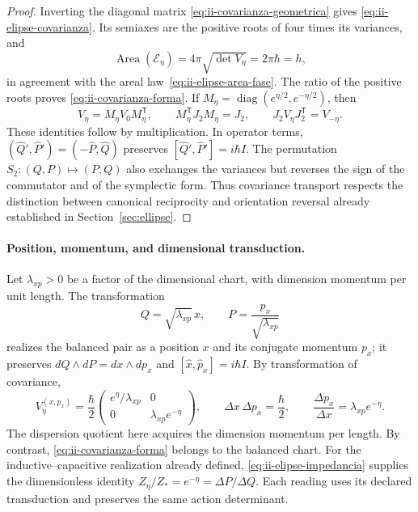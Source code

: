 \begin{proof}
Inverting the diagonal matrix
\eqref{eq:ii-covarianza-geometrica} gives
\eqref{eq:ii-elipse-covarianza}. Its semiaxes are the positive roots of
four times its variances, and
\[
 \operatorname{Area}(\mathcal E_\eta)
 =4\pi\sqrt{\det V_\eta}=2\pi\hbar=h,
\]
in agreement with the areal law~\eqref{eq:ii-elipse-area-fase}.
The ratio of the positive roots proves
\eqref{eq:ii-covarianza-forma}.
If \(M_\eta=\operatorname{diag}(e^{\eta/2},e^{-\eta/2})\), then
\[
 V_\eta=M_\eta V_0M_\eta^{\mathsf T},\qquad
 M_\eta^{\mathsf T}J_2M_\eta=J_2,\qquad
 J_2V_\eta J_2^{\mathsf T}=V_{-\eta}.
\]
These identities follow by multiplication. In operator terms,
\((\widehat Q',\widehat P')=(-\widehat P,\widehat Q)\) preserves
\([\widehat Q',\widehat P']=i\hbar I\). The permutation
\(S_2:(Q,P)\mapsto(P,Q)\) also exchanges the variances but reverses
the sign of the commutator and of the symplectic form. Thus covariance
transport respects the distinction between canonical reciprocity and
orientation reversal already established in Section~\ref{sec:ellipse}.
\end{proof}

\paragraph{Position, momentum, and dimensional transduction.}
Let \(\lambda_{xp}>0\) be a factor of the dimensional chart, with dimension
momentum per unit length. The transformation
\[
 Q=\sqrt{\lambda_{xp}}\,x,\qquad
 P=\frac{p_x}{\sqrt{\lambda_{xp}}}
\]
realizes the balanced pair as a position \(x\) and its conjugate momentum
\(p_x\); it preserves \(dQ\wedge dP=dx\wedge dp_x\) and
\([\widehat x,\widehat p_x]=i\hbar I\). By transformation of
covariance,
\begin{equation}
 V_\eta^{(x,p_x)}=\frac{\hbar}{2}
 \begin{pmatrix}e^\eta/\lambda_{xp}&0\\
                 0&\lambda_{xp}e^{-\eta}\end{pmatrix},\qquad
 \Delta x\,\Delta p_x=\frac{\hbar}{2},\qquad
 \frac{\Delta p_x}{\Delta x}=\lambda_{xp}e^{-\eta}.
 \label{eq:ii-covarianza-dimensiones}
\end{equation}
The dispersion quotient here acquires the dimension momentum per length.
By contrast, \eqref{eq:ii-covarianza-forma} belongs to the balanced chart.
For the inductive--capacitive realization already defined,
\eqref{eq:ii-elipse-impedancia} supplies the dimensionless identity
\(Z_\eta/Z_*=e^{-\eta}=\Delta P/\Delta Q\).
Each reading uses its declared transduction and preserves the same
action determinant.


